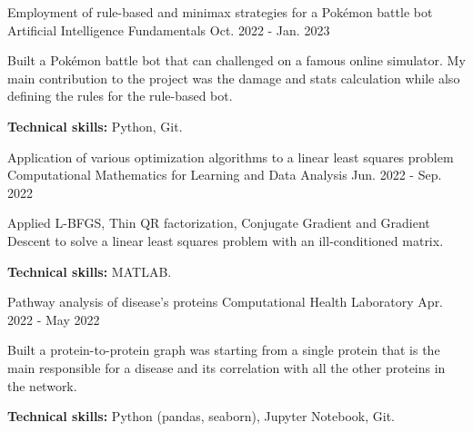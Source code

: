 

\begin{cventries}

\cventry
{Employment of rule-based and minimax strategies for a Pokémon battle bot} %
{Artificial Intelligence Fundamentals} %
{} %
{Oct. 2022 - Jan. 2023} %
{
    \begin{cvitems}
        \item{Built a Pokémon battle bot that can challenged on a famous online simulator. My main contribution to the project was the damage and stats calculation while also defining the rules for the rule-based bot.}
        \item{\textbf{Technical skills:} Python, Git.}
    \end{cvitems}
}

\cventry
{Application of various optimization algorithms to a linear least squares problem} %
{Computational Mathematics for Learning and Data Analysis} %
{} %
{Jun. 2022 - Sep. 2022} %
{
    \begin{cvitems}
        \item{Applied L-BFGS, Thin QR factorization, Conjugate Gradient and Gradient Descent to solve a linear least squares problem with an ill-conditioned matrix.}
        \item{\textbf{Technical skills:} MATLAB.}
    \end{cvitems}
}

\cventry
{Pathway analysis of disease's proteins} %
{Computational Health Laboratory} %
{} %
{Apr. 2022 - May 2022} %
{
    \begin{cvitems}
        \item{Built a protein-to-protein graph was starting from a single protein that is the main responsible for a disease and its correlation with all the other proteins in the network.}
        \item{\textbf{Technical skills:} Python (pandas, seaborn), Jupyter Notebook, Git.}
    \end{cvitems}
}


\end{cventries}

